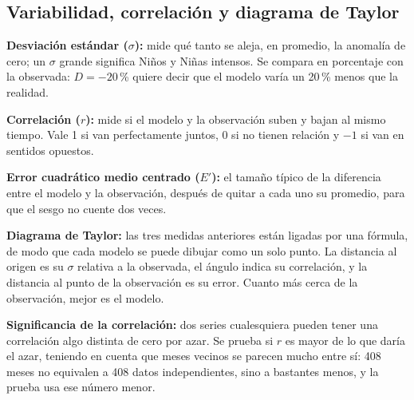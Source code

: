 \documentclass[11pt,a4paper]{article}
\begin{document}
\subsection{Variabilidad, correlación y diagrama de Taylor}
\label{sec:taylor}

\begin{basico}
\textbf{Desviación estándar ($\sigma$):} mide qué tanto se aleja, en promedio, la anomalía de cero; un $\sigma$ grande significa Niños y Niñas intensos. Se compara en porcentaje con la observada: $D = -20$\,\% quiere decir que el modelo varía un 20\,\% menos que la realidad.

\textbf{Correlación ($r$):} mide si el modelo y la observación suben y bajan al mismo tiempo. Vale 1 si van perfectamente juntos, 0 si no tienen relación y $-1$ si van en sentidos opuestos.

\textbf{Error cuadrático medio centrado ($E'$):} el tamaño típico de la diferencia entre el modelo y la observación, después de quitar a cada uno su promedio, para que el sesgo no cuente dos veces.

\textbf{Diagrama de Taylor:} las tres medidas anteriores están ligadas por una fórmula, de modo que cada modelo se puede dibujar como un solo punto. La distancia al origen es su $\sigma$ relativa a la observada, el ángulo indica su correlación, y la distancia al punto de la observación es su error. Cuanto más cerca de la observación, mejor es el modelo.

\textbf{Significancia de la correlación:} dos series cualesquiera pueden tener una correlación algo distinta de cero por azar. Se prueba si $r$ es mayor de lo que daría el azar, teniendo en cuenta que meses vecinos se parecen mucho entre sí: 408 meses no equivalen a 408 datos independientes, sino a bastantes menos, y la prueba usa ese número menor.
\end{basico}
\end{document}
